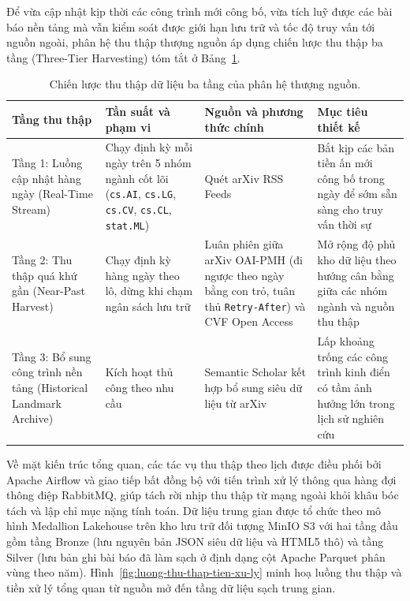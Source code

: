 Để vừa cập nhật kịp thời các công trình mới công bố, vừa tích luỹ được các bài báo nền tảng mà vẫn kiểm soát được giới hạn lưu trữ và tốc độ truy vấn tới nguồn ngoài, phân hệ thu thập thượng nguồn áp dụng chiến lược thu thập ba tầng (Three-Tier Harvesting) tóm tắt ở Bảng~\ref{tab:chien-luoc-thu-thap}.

\begin{table}[htbp]
    \centering
    \caption{Chiến lược thu thập dữ liệu ba tầng của phân hệ thượng nguồn.}
    \label{tab:chien-luoc-thu-thap}
    \small
    \begin{tabularx}{\textwidth}{@{}>{\raggedright\arraybackslash}p{3.4cm}>{\raggedright\arraybackslash}p{3.4cm}>{\raggedright\arraybackslash}p{4.3cm}>{\raggedright\arraybackslash}X@{}}
        \toprule
        \textbf{Tầng thu thập} & \textbf{Tần suất và phạm vi} & \textbf{Nguồn và phương thức chính} & \textbf{Mục tiêu thiết kế} \\
        \midrule
        Tầng 1: Luồng cập nhật hàng ngày (Real-Time Stream) & Chạy định kỳ mỗi ngày trên 5 nhóm ngành cốt lõi (\texttt{cs.AI}, \texttt{cs.LG}, \texttt{cs.CV}, \texttt{cs.CL}, \texttt{stat.ML}) & Quét arXiv RSS Feeds & Bắt kịp các bản tiền ấn mới công bố trong ngày để sớm sẵn sàng cho truy vấn thời sự \\
        Tầng 2: Thu thập quá khứ gần (Near-Past Harvest) & Chạy định kỳ hàng ngày theo lô, dừng khi chạm ngân sách lưu trữ & Luân phiên giữa arXiv OAI-PMH (đi ngược theo ngày bằng con trỏ, tuân thủ \texttt{Retry-After}) và CVF Open Access & Mở rộng độ phủ kho dữ liệu theo hướng cân bằng giữa các nhóm ngành và nguồn thu thập \\
        Tầng 3: Bổ sung công trình nền tảng (Historical Landmark Archive) & Kích hoạt thủ công theo nhu cầu & Semantic Scholar kết hợp bổ sung siêu dữ liệu từ arXiv & Lấp khoảng trống các công trình kinh điển có tầm ảnh hưởng lớn trong lịch sử nghiên cứu \\
        \bottomrule
    \end{tabularx}
\end{table}

Về mặt kiến trúc tổng quan, các tác vụ thu thập theo lịch được điều phối bởi Apache Airflow và giao tiếp bất đồng bộ với tiến trình xử lý thông qua hàng đợi thông điệp RabbitMQ, giúp tách rời nhịp thu thập từ mạng ngoài khỏi khâu bóc tách và lập chỉ mục nặng tính toán. Dữ liệu trung gian được tổ chức theo mô hình Medallion Lakehouse trên kho lưu trữ đối tượng MinIO S3 với hai tầng đầu gồm tầng Bronze (lưu nguyên bản JSON siêu dữ liệu và HTML5 thô) và tầng Silver (lưu bản ghi bài báo đã làm sạch ở định dạng cột Apache Parquet phân vùng theo năm). Hình~\ref{fig:luong-thu-thap-tien-xu-ly} minh hoạ luồng thu thập và tiền xử lý tổng quan từ nguồn mở đến tầng dữ liệu sạch trung gian.

